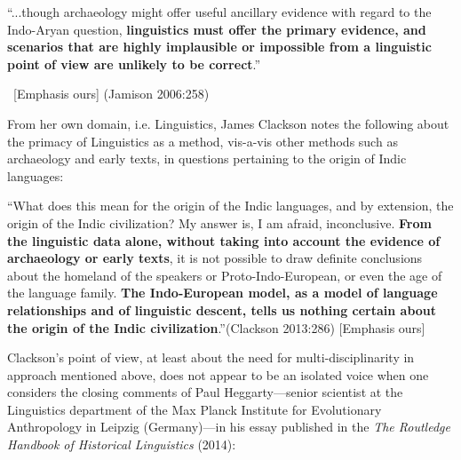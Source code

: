 \begin{myquote}
“...though archaeology might offer useful ancillary evidence with regard to the Indo-Aryan question, \textbf{linguistics must offer the primary evidence, and scenarios that are highly implausible or impossible from a linguistic point of view are unlikely to be correct}.” 

~\hfill [Emphasis ours] (Jamison 2006:258)
\end{myquote}

From her own domain, i.e. Linguistics, James Clackson notes the following about the primacy of Linguistics as a method, vis-a-vis other methods such as archaeology and early texts, in questions pertaining to the origin of Indic languages:

\begin{myquote}
“What does this mean for the origin of the Indic languages, and by extension, the origin of the Indic civilization? My answer is, I am afraid, inconclusive. \textbf{From the linguistic data alone, without taking into account the evidence of archaeology or early texts}, it is not possible to draw definite conclusions about the homeland of the speakers or Proto-Indo-European, or even the age of the language family. \textbf{The Indo-European model, as a model of language relationships and of linguistic descent, tells us nothing certain about the origin of the Indic civilization}.”\hfill (Clackson 2013:286) [Emphasis ours]
\end{myquote}

Clackson’s point of view, at least about the need for multi-disciplinarity in approach mentioned above, does not appear to be an isolated voice when one considers the closing comments of Paul Heggarty—senior scientist at the Linguistics department of the Max Planck Institute for Evolutionary Anthropology in Leipzig (Germany)—in his essay published in the \textit{The Routledge Handbook of Historical Linguistics }(2014):

